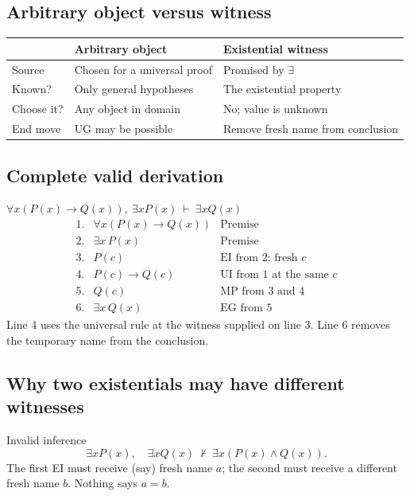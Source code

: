 \documentclass[10pt]{article}
\begin{document}
\begin{multicols}{2}
\subsection*{Arbitrary object versus witness}
\begin{center}
\renewcommand{\arraystretch}{1.18}
\begin{tabularx}{\linewidth}{@{}MYY@{}}
\toprule
& \textbf{Arbitrary object} & \textbf{Existential witness} \\
\midrule
Source & Chosen for a universal proof & Promised by $\exists$ \\
Known? & Only general hypotheses & The existential property \\
Choose it? & Any object in domain & No; value is unknown \\
End move & UG may be possible & Remove fresh name from conclusion \\
\bottomrule
\end{tabularx}
\end{center}

\columnbreak
\subsection*{Complete valid derivation}

\begin{workedbox}{$\forall x(P(x)\to Q(x)),\ \exists xP(x)\ \vdash\ \exists xQ(x)$}
\[
\begin{array}{rll}
1.&\forall x(P(x)\to Q(x))&\text{Premise}\\
2.&\exists x\,P(x)&\text{Premise}\\
3.&P(c)&\text{EI from 2; fresh }c\\
4.&P(c)\to Q(c)&\text{UI from 1 at the same }c\\
5.&Q(c)&\text{MP from 3 and 4}\\
6.&\exists x\,Q(x)&\text{EG from 5}
\end{array}
\]
Line 4 uses the universal rule at the witness supplied on line 3. Line 6 removes
the temporary name from the conclusion.
\end{workedbox}

\subsection*{Why two existentials may have different witnesses}

\begin{warningbox}{Invalid inference}
\[
\exists xP(x),\quad \exists xQ(x)
\ \nvdash\ \exists x(P(x)\land Q(x)).
\]
The first EI must receive (say) fresh name $a$; the second must receive a
different fresh name $b$. Nothing says $a=b$.


\end{warningbox}
\end{multicols}
\end{document}
